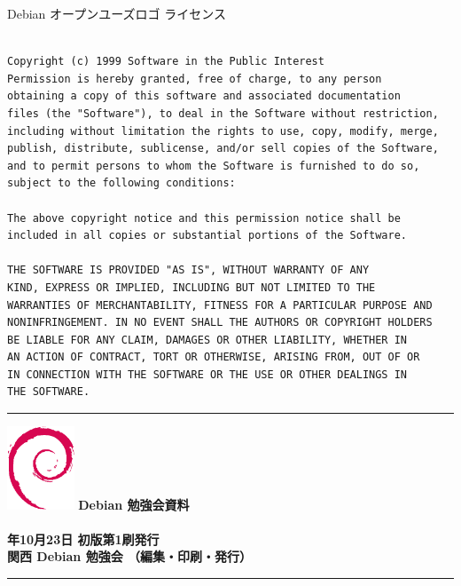 \documentclass[mingoth,a4paper]{jsarticle}
\newcommand{\debmtgyear}{2016}
\newcommand{\debmtgdate}{23}
\newcommand{\debmtgmonth}{10}
\begin{document}
\begin{center}
Debian オープンユーズロゴ ライセンス
\end{center}

\begin{multicols}{2}
 \begin{fontsize}{6}{6}
 \begin{verbatim}

Copyright (c) 1999 Software in the Public Interest
Permission is hereby granted, free of charge, to any person
obtaining a copy of this software and associated documentation
files (the "Software"), to deal in the Software without restriction,
including without limitation the rights to use, copy, modify, merge,
publish, distribute, sublicense, and/or sell copies of the Software,
and to permit persons to whom the Software is furnished to do so,
subject to the following conditions:

The above copyright notice and this permission notice shall be
included in all copies or substantial portions of the Software.

THE SOFTWARE IS PROVIDED "AS IS", WITHOUT WARRANTY OF ANY
KIND, EXPRESS OR IMPLIED, INCLUDING BUT NOT LIMITED TO THE
WARRANTIES OF MERCHANTABILITY, FITNESS FOR A PARTICULAR PURPOSE AND
NONINFRINGEMENT. IN NO EVENT SHALL THE AUTHORS OR COPYRIGHT HOLDERS
BE LIABLE FOR ANY CLAIM, DAMAGES OR OTHER LIABILITY, WHETHER IN
AN ACTION OF CONTRACT, TORT OR OTHERWISE, ARISING FROM, OUT OF OR
IN CONNECTION WITH THE SOFTWARE OR THE USE OR OTHER DEALINGS IN
THE SOFTWARE.
 \end{verbatim}
 \end{fontsize}
\end{multicols}

\printindex

 \begin{minipage}[b]{0.2\hsize}
 \end{minipage}
 \begin{minipage}[b]{0.8\hsize}

 \vspace*{15cm}
 \rule{\hsize}{1mm}
 \vspace{2mm}
 \includegraphics[width=2cm]{image200502/openlogo-nd.eps}
 \noindent \Large \bfseries{Debian 勉強会資料}\\ \\
 \noindent \normalfont \debmtgyear{}年\debmtgmonth{}月\debmtgdate{}日 \hspace{5mm}  初版第1刷発行\\
 \noindent \normalfont 関西 Debian 勉強会 （編集・印刷・発行）\\
 \rule{\hsize}{1mm}
 \end{minipage}
\end{document}
